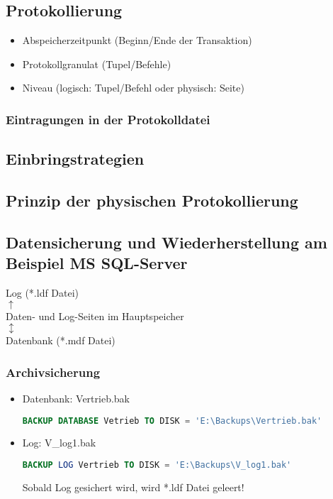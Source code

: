 \subsection{Protokollierung}
\begin{itemize}
\item Abspeicherzeitpunkt (Beginn/Ende der Transaktion)
\item Protokollgranulat (Tupel/Befehle)
\item Niveau (logisch: Tupel/Befehl oder physisch: Seite)
\end{itemize}
\subsubsection*{Eintragungen in der Protokolldatei}
\subsection{Einbringstrategien}
\subsection{Prinzip der physischen Protokollierung}
\subsection{Datensicherung und Wiederherstellung am Beispiel MS SQL-Server}
Log (*.ldf Datei)\\
$\uparrow$\\
Daten- und Log-Seiten im Hauptspeicher \\
$\updownarrow$ \\
Datenbank (*.mdf Datei)
\subsubsection*{Archivsicherung}
\begin{itemize}
\item Datenbank: Vertrieb.bak
\begin{lstlisting}[language=SQL]
BACKUP DATABASE Vetrieb TO DISK = 'E:\Backups\Vertrieb.bak'
\end{lstlisting}
\item Log: V\_log1.bak
\begin{lstlisting}[language=SQL]
BACKUP LOG Vertrieb TO DISK = 'E:\Backups\V_log1.bak'
\end{lstlisting}
Sobald Log gesichert wird, wird *.ldf Datei geleert!
\end{itemize}
